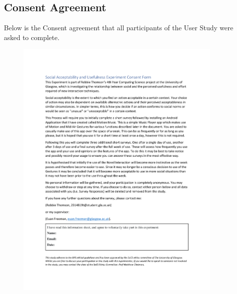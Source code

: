 \documentclass{l4proj}
\begin{document}
\begin{appendices}
\chapter{Consent Agreement}
Below is the Consent agreement that all participants of the User Study were asked to complete.
\begin{figure}[h!]
    \centering
    \includegraphics[width=0.9\textwidth]{images/SocialAcceptabilityConsentForm.pdf}
\end{figure}



\end{appendices}
\end{document}
